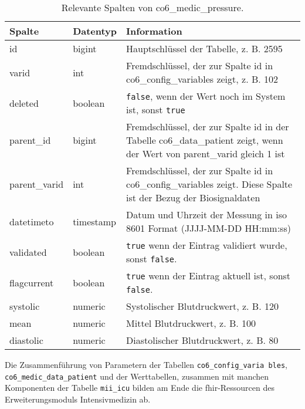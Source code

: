 \begin{longtable}{|l|l|p{8cm}|}
	\caption[Relevante Spalten von co6\_medic\_pressure]{Relevante Spalten von co6\_medic\_pressure.}
	\label{tab:valuepress}
	\endfirsthead
		\hline
		\bfseries Spalte & \bfseries Datentyp & \bfseries Information \\ \hline
		id & bigint & Hauptschlüssel der Tabelle, z. B. 2595 \\ \hline
		varid & int & Fremdschlüssel, der zur Spalte id in co6\_config\_variables zeigt, z. B. 102 \\ \hline
		deleted & boolean & \texttt{false}, wenn der Wert noch im System ist, sonst \texttt{true} \\ \hline
		parent\_id & bigint & Fremdschlüssel, der zur Spalte id in der Tabelle co6\_data\_patient zeigt, wenn der Wert von parent\_varid gleich 1 ist \\ \hline
		parent\_varid & int & Fremdschlüssel, der zur Spalte id in co6\_config\_variables zeigt. Diese Spalte ist der Bezug der Biosignaldaten \\ \hline
		datetimeto & timestamp & Datum und Uhrzeit der Messung in \acs{iso} 8601 Format (JJJJ-MM-DD HH:mm:ss)\\ \hline
		validated & boolean & \texttt{true} wenn der Eintrag validiert wurde, sonst \texttt{false}. \\ \hline
		flagcurrent & boolean & \texttt{true} wenn der Eintrag aktuell ist, sonst \texttt{false}. \\ \hline
		systolic & numeric & Systolischer Blutdruckwert, z. B. 120 \\ \hline
		mean & numeric & Mittel Blutdruckwert, z. B. 100 \\ \hline
		diastolic & numeric & Diastolischer Blutdruckwert, z. B. 80 \\ \hline
\end{longtable}

\newpage

Die Zusammenführung von Parametern der Tabellen \texttt{co6\_config\_varia bles}, \texttt{co6\_medic\_data\_patient} und der Werttabellen, zusammen mit manchen Komponenten der Tabelle \texttt{mii\_icu} bilden am Ende die \ac{fhir}-Ressourcen des Erweiterungsmoduls \glqq Intensivmedizin\grqq{} ab.